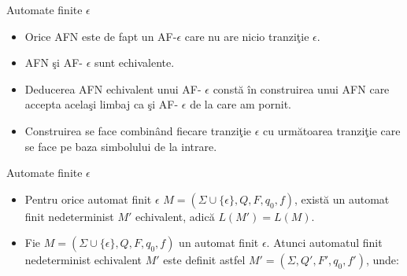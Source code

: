 \documentclass[pdf]{beamer}
\begin{document}
\begin{frame}{Automate finite $\epsilon$}
\begin{itemize}
\item
Orice AFN este de fapt un AF-$\epsilon$ care nu are nicio tranziţie $\epsilon$.
\item
AFN şi AF- $\epsilon$ sunt echivalente.
\item
Deducerea AFN echivalent unui AF- $\epsilon$ constă în construirea unui AFN care accepta acelaşi limbaj ca şi AF- $\epsilon$ de la care am pornit.
\item
Construirea se face combinând fiecare tranziţie $\epsilon$ cu următoarea tranziţie care se face pe baza simbolului de la intrare.
\end{itemize}
\end{frame}



\begin{frame}{Automate finite $\epsilon$}
\begin{itemize}
\item
Pentru orice automat finit $\epsilon$ $M=(\Sigma \cup \{ \epsilon \}, Q, F, q_{0}, f)$, există un automat finit nedeterminist $M'$ echivalent, adică $L(M') = L(M).$

\item
Fie $M=(\Sigma \cup \{ \epsilon \}, Q, F, q_{0}, f)$ un automat finit $\epsilon$. Atunci automatul finit nedeterminist echivalent $M'$ este definit astfel $M'=(\Sigma, Q', F', q_{0}, f')$, unde:

\begin{center}
\end{center}
\end{itemize}
\end{frame}
\end{document}
